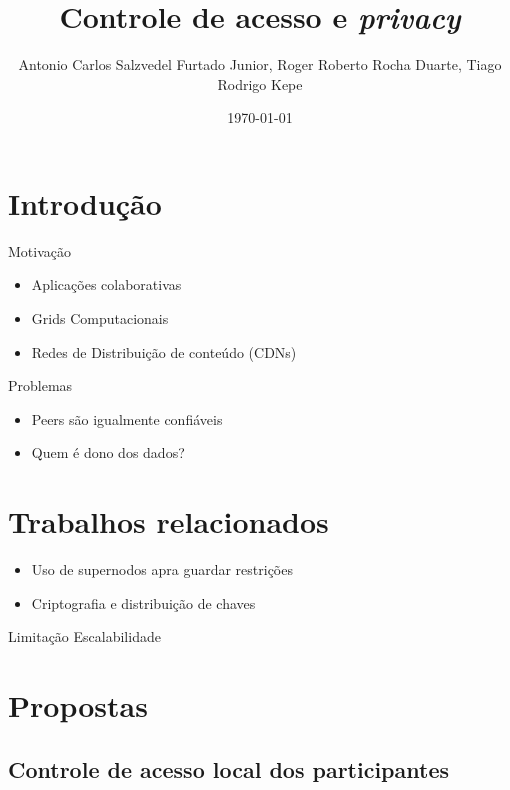 \documentclass{beamer}
\title[Trabalho de Gerenciamento de Dados Distribuídos - CI303]{Controle de acesso e \textit{privacy}}
\author[Antonio Carlos, Roger e Tiago.]{Antonio Carlos Salzvedel Furtado Junior, Roger Roberto Rocha Duarte, Tiago Rodrigo Kepe}
\institute{Universidade Federal do Paraná - UFPR}
\date{\today}
\begin{document}
\begin{frame}
\titlepage
\end{frame}


\section{Introdução}


\begin{frame}{Motivação}

	\begin{itemize}
	 \item Aplicações colaborativas
	 \item Grids Computacionais
	 \item Redes de Distribuição de conteúdo (CDNs)
	\end{itemize}
\end{frame}

\begin{frame}{Problemas}

	\begin{itemize}
	 \item Peers são igualmente confiáveis
	 \item Quem é dono dos dados?
	\end{itemize}
\end{frame}


\section{Trabalhos relacionados}
\begin{frame}
    \begin{itemize}
      \item Uso de supernodos apra guardar restrições
      \item Criptografia e distribuição de chaves
    \end{itemize}
    \begin{block}{Limitação}
      Escalabilidade
    \end{block}

  \end{frame}

\section{Propostas}

\subsection{Controle de acesso local dos participantes} %
\end{document}
